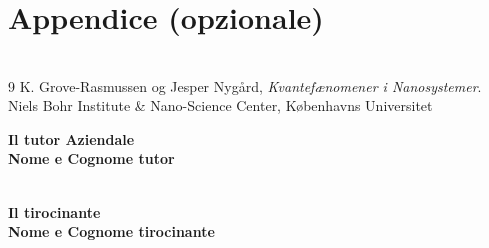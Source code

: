 \documentclass{article}
\newcommand{\tirocinante}{\textbf{Nome e Cognome tirocinante}}
\newcommand{\tutorAziendale}{\textbf{Nome e Cognome tutor}}
\begin{document}

\section*{Appendice (opzionale)}
\appendix
\section{}

\section{}

\begin{thebibliography}{9}
  K. Grove-Rasmussen og Jesper Nygård,
  \emph{Kvantefænomener i Nanosystemer}.
  Niels Bohr Institute \& Nano-Science Center, Københavns Universitet
\end{thebibliography}

\vspace*{1cm}
\textbf{Il tutor Aziendale}
\\
\textbf{\tutorAziendale}
\\
\\
\begin{flushright}
	\textbf{Il tirocinante} \\
	\tirocinante
\end{flushright}
\end{document}
